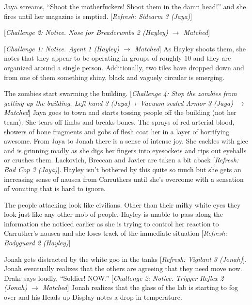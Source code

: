 Jaya screams, ``Shoot the motherfuckers!  Shoot them in the damn head!'' and she fires until her magazine is emptied.  {[}\textit{Refresh: Sidearm 3 (Jaya)}{]}

{[}\textit{Challenge 2: Notice.  Nose for Breadcrumbs 2 (Hayley) $\rightarrow$ Matched}{]}

{[}\textit{Challenge 1: Notice. Agent 1 (Hayley) $\rightarrow$ Matched}{]}  As Hayley shoots them, she notes that they appear to be operating in groups of roughly 10 and they are organized around a single person.  Additionally, two tiles have dropped down and from one of them something shiny, black and vaguely circular is emerging.

The zombies start swarming the building.  {[}\textit{Challenge 4: Stop the zombies from getting up the building.  Left hand 3 (Jaya) + Vacuum-sealed Armor 3 (Jaya) $\rightarrow$ Matched}{]}  Jaya goes to town and starts tossing people off the building (not her team).  She tears off limbs and breaks bones.  The sprays of red arterial blood, showers of bone fragments and gobs of flesh coat her in a layer of horrifying awesome.  From Jaya to Jonah there is a sense of intense joy.  She cackles with glee and is grinning madly as she digs her fingers into eyesockets and rips out eyeballs or crushes them.  Lackovich, Breccan and Javier are taken a bit aback {[}\textit{Refresh: Bad Cop 3 (Jaya)}{]}.  Hayley isn't bothered by this quite so much but she gets an increasing sense of nausea from Carruthers until she's overcome with a sensation of vomiting that is hard to ignore.



The people attacking look like civilians.  Other than their milky white eyes they look just like any other mob of people.  Hayley is unable to pass along the information she noticed earlier as she is trying to control her reaction to Carruther's nausea and she loses track of the immediate situation {[}\textit{Refresh: Bodyguard 2 (Hayley)}{]}





Jonah gets distracted by the white goo in the tanks {[}\textit{Refresh: Vigilant 3 (Jonah)}{]}.  Jonah eventually realizes that the others are agreeing that they need move now.  Drake says loudly, ``Soldier!  NOW.''  {[}\textit{Challenge 2: Notice. Trigger Reflex 2 (Jonah) $\rightarrow$ Matched}{]}  Jonah realizes that the glass of the lab is starting to fog over and his Heads-up Display notes a drop in temperature.

